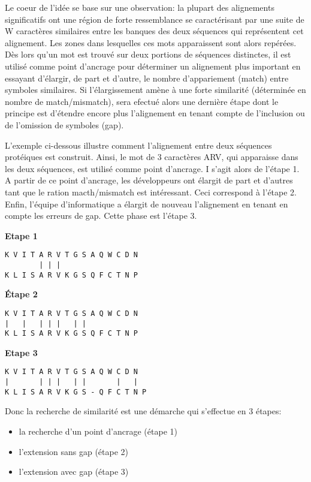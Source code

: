 Le coeur de l'idée se base sur une observation: la
plupart des alignements significatifs ont une région
de forte ressemblance se caractérisant par une suite
de W caractères similaires entre les banques des deux
séquences qui représentent cet alignement.
Les zones dans lesquelles ces mots apparaissent sont alors
repérées. Dès lors qu'un mot est trouvé sur deux
portions de séquences distinctes, il est utilisé
comme point d'ancrage pour déterminer un alignement
plus important en essayant d'élargir, de part et
d'autre, le nombre d'appariement (match) entre symboles
similaires. Si l'élargissement amène à une forte
similarité (déterminée en nombre de match/mismatch),
sera efectué alors une dernière étape dont le
principe est d'étendre encore plus l'alignement en
tenant compte de l'inclusion ou de l'omission de
symboles (gap).

L'exemple ci-dessous illustre comment l'alignement
entre deux séquences protéiques est construit.
Ainsi, le mot de 3 caractères ARV, qui apparaisse
dans les deux séquences, est utilisé comme point
d'ancrage. I s'agit alors de l'étape 1. A partir
de ce point d'ancrage, les développeurs ont élargit
de part et d'autres tant que le ration macth/mismatch
est intéressant.
Ceci correspond à l'étape 2.
Enfin, l'équipe d'informatique a élargit de
nouveau l'alignement en tenant en compte les erreurs
de gap. Cette phase est l'étape 3.

{\bf Etape 1}

\begin{verbatim}
K V I T A R V T G S A Q W C D N
        | | |
K L I S A R V K G S Q F C T N P
\end{verbatim}

{\bf Étape 2}

\begin{verbatim}
K V I T A R V T G S A Q W C D N
|   |   | | |   | |
K L I S A R V K G S Q F C T N P
\end{verbatim}

{\bf Etape 3}

\begin{verbatim}
K V I T A R V T G S A Q W C D N
|       | | |   | |       |   |
K L I S A R V K G S - Q F C T N P
\end{verbatim}

Donc la recherche de similarité est une démarche qui
s'effectue en 3 étapes:

\begin{itemize}
\item la recherche d'un point d'ancrage (étape 1)
\item l'extension sans gap (étape 2)
\item l'extension avec gap (étape 3)
\end{itemize}

